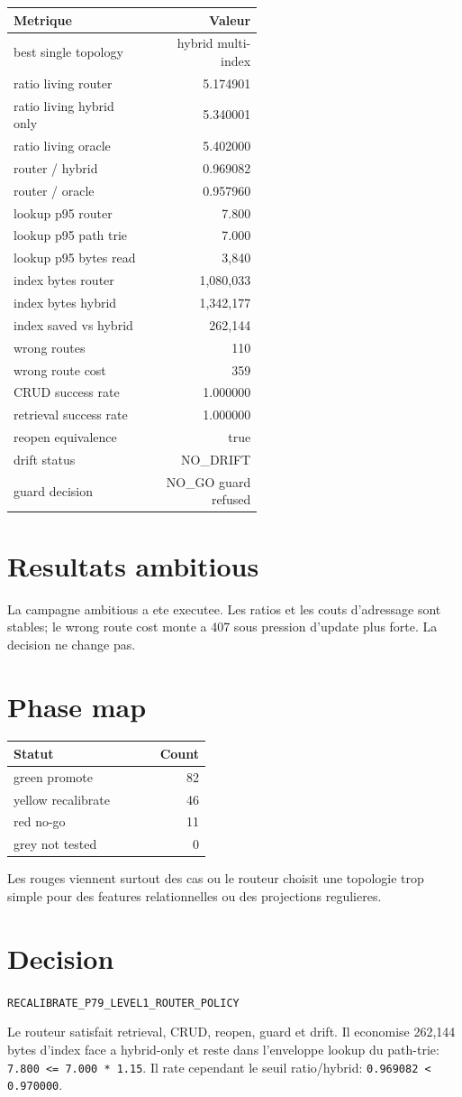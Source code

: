 \documentclass[a4paper,11pt]{article}
\newcommand{\Metric}[2]{#1 & #2\\}
\newcommand{\Decision}{\texttt{RECALIBRATE\_P79\_LEVEL1\_ROUTER\_POLICY}}
\begin{document}
\begin{longtable}{@{}p{0.55\linewidth}r@{}}
\toprule
Metrique & Valeur\\
\midrule
\Metric{best single topology}{hybrid multi-index}
\Metric{ratio living router}{5.174901}
\Metric{ratio living hybrid only}{5.340001}
\Metric{ratio living oracle}{5.402000}
\Metric{router / hybrid}{0.969082}
\Metric{router / oracle}{0.957960}
\Metric{lookup p95 router}{7.800}
\Metric{lookup p95 path trie}{7.000}
\Metric{lookup p95 bytes read}{3,840}
\Metric{index bytes router}{1,080,033}
\Metric{index bytes hybrid}{1,342,177}
\Metric{index saved vs hybrid}{262,144}
\Metric{wrong routes}{110}
\Metric{wrong route cost}{359}
\Metric{CRUD success rate}{1.000000}
\Metric{retrieval success rate}{1.000000}
\Metric{reopen equivalence}{true}
\Metric{drift status}{NO\_DRIFT}
\Metric{guard decision}{NO\_GO guard refused}
\bottomrule
\end{longtable}

\section{Resultats ambitious}

La campagne ambitious a ete executee. Les ratios et les couts d'adressage sont
stables; le wrong route cost monte a 407 sous pression d'update plus forte. La
decision ne change pas.

\section{Phase map}

\begin{longtable}{@{}p{0.55\linewidth}r@{}}
\toprule
Statut & Count\\
\midrule
\Metric{green promote}{82}
\Metric{yellow recalibrate}{46}
\Metric{red no-go}{11}
\Metric{grey not tested}{0}
\bottomrule
\end{longtable}

Les rouges viennent surtout des cas ou le routeur choisit une topologie trop
simple pour des features relationnelles ou des projections regulieres.

\section{Decision}

\Decision

Le routeur satisfait retrieval, CRUD, reopen, guard et drift. Il economise
262,144 bytes d'index face a hybrid-only et reste dans l'enveloppe lookup du
path-trie: \texttt{7.800 <= 7.000 * 1.15}. Il rate cependant le seuil
ratio/hybrid: \texttt{0.969082 < 0.970000}.
\end{document}
